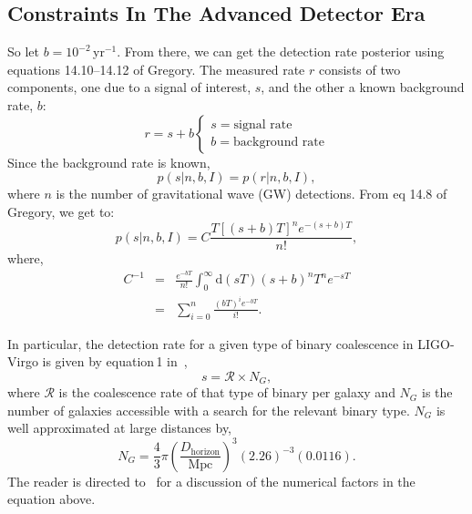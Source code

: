 \documentclass[a0,landscape]{a0poster}
\newcommand{\cbcrate}{{{\mathcal R}}}
\newcommand{\diff}{{\mathrm d}}
\def\gw#1{gravitational wave#1 (GW#1)\gdef\gw{GW}}
\begin{document}
\begin{multicols}{4}
\section*{\centering Constraints In The Advanced Detector Era}


So let $b=10^{-2}$\,yr$^{-1}$.  From there, we can get the detection rate
posterior using equations 14.10--14.12 of Gregory.  The measured rate $r$
consists of two components, one due to a signal of interest, $s$, and the other
a known background rate, $b$:
\begin{equation}
r = s + b
\begin{cases}
s = \text{signal rate} \\
b = \text{background rate}
\end{cases}
\end{equation}
%
Since the background rate is known,
\begin{equation}
p(s|n,b,I) = p(r|n,b,I),
\end{equation}
%
where $n$ is the number of \gw{} detections.  From eq 14.8 of Gregory, we get
to:
\begin{equation}
p(s|n,b,I) = C \frac{ T\left[(s+b)T\right]^n e^{-(s+b)T}}{n!},
\end{equation}
%
where,
\begin{eqnarray}
C^{-1} & = &\frac{e^{-bT}}{n!} \int_0^{\infty}\diff(sT)(s+b)^n T^n e^{-sT}\\
& = & \sum_{i=0}^n \frac{ (bT)^i e^{-bT}}{i!}.
\end{eqnarray}

In particular,  the detection rate for a given type of binary coalescence in
LIGO-Virgo is given by equation\,1 in~\cite{rates_paper},
\begin{equation}
s = \cbcrate \times N_G,
\end{equation}
%
where $\cbcrate$ is the coalescence rate of that type of binary per galaxy and
$N_G$ is the number of galaxies accessible with a search for the relevant binary
type.  $N_G$ is well approximated at large distances by,
%
\begin{equation}
N_G = \frac{4}{3} \pi \left( \frac{D_{\textrm{horizon}}}{\textrm{Mpc}}
\right)^3 (2.26)^{-3} (0.0116).
\end{equation}
%
The reader is directed to~\cite{rates_paper} for a discussion of the numerical
factors in the equation above.


\end{multicols}
\end{document}
